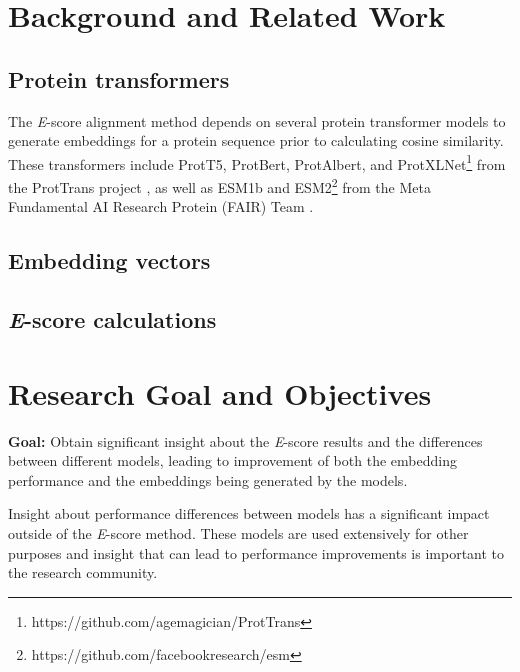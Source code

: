\documentclass[
	letterpaper, %
	10pt, %
]{LTJournalArticle}
\begin{document}
\section{Background and Related Work}

\subsection{Protein transformers}
The \textit{E}-score alignment method depends on several protein transformer models to generate embeddings for a protein sequence prior to calculating cosine similarity. These transformers include ProtT5, ProtBert, ProtAlbert, and ProtXLNet\footnote{https://github.com/agemagician/ProtTrans} from the ProtTrans project \autocite{Elnaggar:2021}, as well as ESM1b and ESM2\footnote{https://github.com/facebookresearch/esm} from the Meta Fundamental AI Research Protein (FAIR) Team \autocite{Rives:2021}.



\subsection{Embedding vectors}


\subsection{\textit{E}-score calculations}

\section{Research Goal and Objectives}
\textbf{Goal: }Obtain significant insight about the \textit{E}-score results and the differences between different models, leading to improvement of both the embedding performance and the embeddings being generated by the models.

Insight about performance differences between models has a significant impact outside of the \textit{E}-score method. These models are used extensively for other purposes and insight that can lead to performance improvements is important to the research community.

\end{document}
